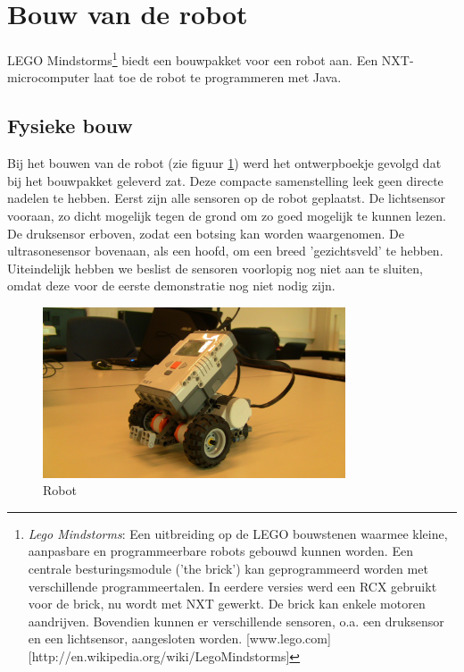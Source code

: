 \documentclass[tt1]{penoverslag}
\begin{document}
\section{Bouw van de robot}
\label{ssec:bouw}
LEGO Mindstorms\footnote{\textit{Lego Mindstorms}:  Een uitbreiding op de LEGO bouwstenen waarmee kleine, aanpasbare en programmeerbare robots gebouwd kunnen worden. Een centrale besturingsmodule ('the brick') kan geprogrammeerd worden met verschillende programmeertalen. In eerdere versies werd een RCX gebruikt voor de brick, nu wordt met NXT gewerkt. De brick kan enkele motoren aandrijven. Bovendien kunnen er verschillende sensoren, o.a. een druksensor en een lichtsensor, aangesloten worden.  \mbox{[www.lego.com]} \mbox{[http://en.wikipedia.org/wiki/Lego\textendash Mindstorms]}} biedt een bouwpakket voor een robot aan. Een NXT-microcomputer laat toe de robot te programmeren met Java.

\subsection{Fysieke bouw}
\label{ssec:fysbouw}
Bij het bouwen van de robot (zie figuur \ref{robot}) werd het ontwerpboekje gevolgd dat bij het bouwpakket geleverd zat. Deze compacte samenstelling leek geen directe nadelen te hebben.
Eerst zijn alle sensoren op de robot geplaatst. De lichtsensor vooraan, zo dicht mogelijk tegen de grond om zo goed mogelijk te kunnen lezen. De druksensor erboven, zodat een botsing kan worden waargenomen. De ultrasonesensor bovenaan, als een hoofd, om een breed 'gezichtsveld' te hebben. Uiteindelijk hebben we beslist de sensoren voorlopig nog niet aan te sluiten, omdat deze voor de eerste demonstratie nog niet nodig zijn.

\begin{figure}[tbp]
\begin{center}
    \includegraphics[width=0.8\textwidth]{robot}
    \caption{Robot}
	\label{robot}
\end{center}
\end{figure}
\end{document}
